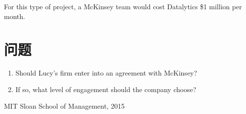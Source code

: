 \documentclass[10pt, a4paper]{ctexart} %
\begin{document}
For this type of project, a McKinsey team would cost Datalytics \$1 million per month.




\section*{问题}
\begin{enumerate}
	\item Should Lucy’s firm enter into an agreement with McKinsey? 
	\item If so, what level of engagement should the company choose? 
\end{enumerate}




\small
\begin{thebibliography}{99}
	\setlength{\parskip}{0pt} %
	 MIT Sloan School of Management, 2015
	\end {thebibliography}
\end{document}
